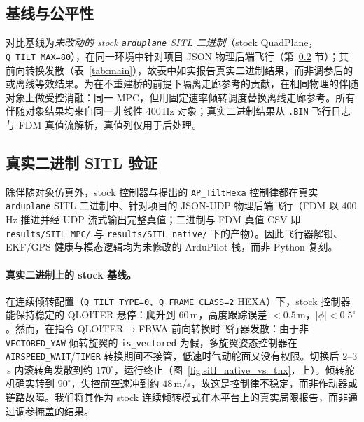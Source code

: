 \documentclass[UTF8,a4paper,11pt]{ctexart}
\begin{document}
\subsection{基线与公平性}\label{sec:baseline}
对比基线为\emph{未改动的 stock \texttt{arduplane} SITL 二进制}（stock QuadPlane，\texttt{Q\_TILT\_MAX=80}），在同一环境中针对项目 JSON 物理后端飞行（第~\ref{sec:realsitl} 节）；其前向转换发散（表~\ref{tab:main}），故表中如实报告真实二进制结果，而非调参后的或离线等效结果。为在不重建桥的前提下隔离走廊参考的贡献，在相同物理的伴随对象上做受控消融：同一 MPC，但用固定速率倾转调度替换离线走廊参考。所有伴随对象结果均来自同一非线性 400\,Hz 对象；真实二进制结果从 \texttt{.BIN} 飞行日志与 FDM 真值流解析，真值列仅用于后处理。

\subsection{真实二进制 SITL 验证}\label{sec:realsitl}
除伴随对象仿真外，stock 控制器与提出的 \texttt{AP\_TiltHexa} 控制律都在真实 \texttt{arduplane} SITL 二进制中、针对项目的 JSON-UDP 物理后端飞行（FDM 以 400\,Hz 推进并经 UDP 流式输出完整真值；二进制与 FDM 真值 CSV 即 \texttt{results/SITL\_MPC/} 与 \texttt{results/SITL\_native/} 下的产物）。因此飞行器解锁、EKF/GPS 健康与模态逻辑均为未修改的 ArduPilot 栈，而非 Python 复刻。

\paragraph{真实二进制上的 stock 基线。}
在连续倾转配置（\texttt{Q\_TILT\_TYPE=0}、\texttt{Q\_FRAME\_CLASS=2} HEXA）下，stock 控制器能保持稳定的 QLOITER 悬停：爬升到 60\,m，高度跟踪误差 $<0.5$\,m，$|\phi|<0.5^\circ$。然而，在指令 QLOITER$\to$FBWA 前向转换时飞行器发散：由于非 \texttt{VECTORED\_YAW} 倾转旋翼的 \texttt{is\_vectored} 为假，多旋翼姿态控制器在 \texttt{AIRSPEED\_WAIT}/\texttt{TIMER} 转换期间不接管，低速时气动舵面又没有权限。切换后 $2$--$3$\,s 内滚转角发散到约 $170^\circ$，运行终止（图~\ref{fig:sitl_native_vs_thx}，上）。倾转舵机确实转到 $90^\circ$，失控前空速冲到约 $48$\,m/s，故这是控制律不稳定，而非作动器或链路故障。我们将其作为 stock 连续倾转模式在本平台上的真实局限报告，而非通过调参掩盖的结果。
\end{document}
